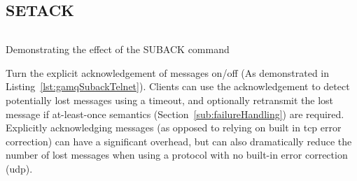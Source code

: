 \subsection{SETACK}
\label{sub:setackCommand}

\begin{listing}[H]
  \centering
  \inputminted{bash}{code/gamqSetackOutput}
  \caption{Demonstrating the effect of the SUBACK command}
  \label{lst:gamqSubackTelnet}
\end{listing}

Turn the explicit acknowledgement of messages on/off (As demonstrated in
Listing~\ref{lst:gamqSubackTelnet}). Clients can use the acknowledgement to
detect potentially lost messages using a timeout, and optionally retransmit the
lost message if at-least-once semantics (Section~\ref{sub:failureHandling}) are
required. Explicitly acknowledging messages (as opposed to relying on built in
\gls{tcp} error correction) can have a significant overhead, but can also
dramatically reduce the number of lost messages when using a protocol with no
built-in error correction (\gls{udp}).
